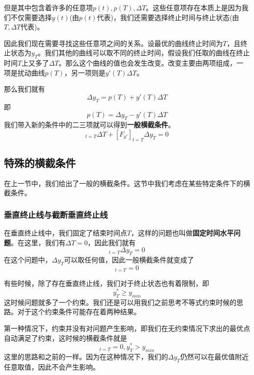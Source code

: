 \documentclass[UTF8,12pt]{ctexart}
\numberwithin{equation}{section} %
\numberwithin{figure}{section}
\numberwithin{table}{section}
\begin{document}
	但是其中包含着许多的任意项$p(t),p(T),\Delta T$。这些任意项存在本质上是因为我们不仅需要选择$y(t)$(由$p(t)$代表)，我们还需要选择终止时间与终止状态(由$T,\Delta T$代表)。
	
	因此我们现在需要寻找这些任意项之间的关系。设最优的曲线终止时间为$T$，且终止状态为$y_T$。我们其他的曲线可以取不同的终止时间，假设我们任取的曲线在终止时间$T$上又多了$\Delta T$。那么这个曲线的值也会发生改变。改变主要由两项组成，一项是扰动曲线$p(T)$，另一项则是$y'(T)\Delta T$。
	
	那么我们就有
	\begin{equation}
		\Delta y_T = p(T) + y'(T)\Delta T
	\end{equation}
	即
	\begin{equation}
		p(T) = \Delta y_T - y'(T)\Delta T
	\end{equation}
	我们带入新的条件中的二三项就可以得到\textbf{一般横截条件}。
	\begin{equation}
		[F-y'F_{y'}]_{t = T}\Delta T + [F_{y'}]_{t = T}\Delta y_T = 0 \label{general transversal condition}
	\end{equation}
	
	\subsection{特殊的横截条件}
	在上一节中，我们给出了一般的横截条件。这节中我们考虑在某些特定条件下的横截条件。
	
	\subsubsection{垂直终止线与截断垂直终止线}
	在垂直终止线中，我们固定了结束时间点$T$，这样的问题也叫做\textbf{固定时间水平问题}。在这里，我们有$\Delta T = 0$，因此我们就有
	\begin{equation}
		[F_{y'}]_{t = T}\Delta y_T = 0 \label{transversal condition one}
	\end{equation}
	在这个问题中，$\Delta y_T$可以取任何值，因此一般横截条件就变成了
	\begin{equation}
		[F_{y'}]_{t = T} = 0
	\end{equation}

	有些时候，除了存在垂直终止线，我们对于终止状态也有着限制，即
	\begin{equation}
		y_T^{*} \geqslant y_{min}
	\end{equation}
	这时候问题就多了一个约束。我们还是可以用我们之前思考不等式约束时候的思路。对于这个约束条件可能存在着两种结果。
	
	第一种情况下，约束并没有对问题产生影响，即我们在无约束情况下求出的最优点自动满足了约束，这时候的横截条件就是
	\begin{equation}
		[F_{y'}]_{t = T} = 0,y_T^{*} > y_{min}
	\end{equation}
	这里的思路和之前的一样。因为在这种情况下，我们的$\Delta y_T$仍然可以在最优值附近任意取值，因此不会产生影响。
	
\end{document}
